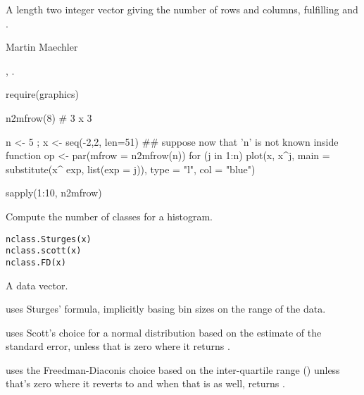 %
\begin{Value}
A length two integer vector  giving the number of rows
and columns, fulfilling  and .
\end{Value}
%
\begin{Author}\relax
Martin Maechler
\end{Author}
%
\begin{SeeAlso}\relax
{}, .
\end{SeeAlso}
%
\begin{Examples}
\begin{ExampleCode}
require(graphics)

n2mfrow(8) # 3 x 3

n <- 5 ; x <- seq(-2,2, len=51)
## suppose now that 'n' is not known {inside function}
op <- par(mfrow = n2mfrow(n))
for (j in 1:n)
   plot(x, x^j, main = substitute(x^ exp, list(exp = j)), type = "l",
   col = "blue")

sapply(1:10, n2mfrow)
\end{ExampleCode}
\end{Examples}
%
\begin{Description}\relax
Compute the number of classes for a histogram.
\end{Description}
%
\begin{Usage}
\begin{verbatim}
nclass.Sturges(x)
nclass.scott(x)
nclass.FD(x)
\end{verbatim}
\end{Usage}
%
\begin{Arguments}
\begin{ldescription}
\item[\code{x}] 
A data vector.

\end{ldescription}
\end{Arguments}
%
\begin{Details}\relax
{} uses Sturges' formula, implicitly basing bin
sizes on the range of the data.

 uses Scott's choice for a normal distribution based on
the estimate of the standard error, unless that is zero where it
returns .

 uses the Freedman-Diaconis choice based on the
inter-quartile range () unless that's zero where it
reverts to  and when that is 
as well, returns .
\end{Details}
